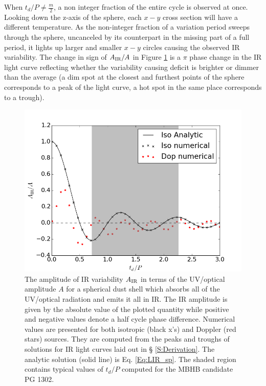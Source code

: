 When $t_d/P \neq \frac{m}{2}$, a non integer fraction of the entire cycle is
observed at once. Looking down the z-axis of the sphere, each $x-y$ cross
section will have a different temperature. As the non-integer fraction of a
variation period sweeps through the sphere, uncanceled by its counterpart in
the missing part of a full period, it lights up larger and smaller $x-y$
circles causing the observed IR variability.  The change in sign of
$A_{\rm{IR}}/A$ in Figure \ref{Fig:AIRoAUV_sp} is a $\pi$ phase change in the
IR light curve reflecting whether the variability causing deficit is brighter
or dimmer than the average (a dim spot at the closest and furthest points of
the sphere corresponds to a peak of the light curve, a hot spot in the same
place corresponds to a trough).



\begin{figure}
\begin{center}
\includegraphics[scale=0.33]{figures/ch5/AIRplots/DopvsISO_AIRoAUV_J1p5708_numin0_numx5_reclim2_TRHS}
\end{center}
%
\caption{The amplitude of IR variability $A_{\rm{IR}}$ in terms  of the
UV/optical amplitude $A$ for a spherical dust shell which absorbs all of the
UV/optical radiation and emits it all in IR. The IR amplitude is given by the
absolute value of the plotted quantity while positive and negative values
denote a half cycle phase difference. Numerical values are presented for both
isotropic (black x's) and Doppler (red stars) sources. They are computed from
the peaks and troughs of solutions for IR light curves laid out in \S
\ref{S:Derivation}. The analytic solution (solid line) is Eq. \ref{Eq:LIR_sp}.
The shaded region contains typical values of $t_d/P$ computed for the MBHB
candidate PG 1302.}
%
\label{Fig:AIRoAUV_sp}
\end{figure}



